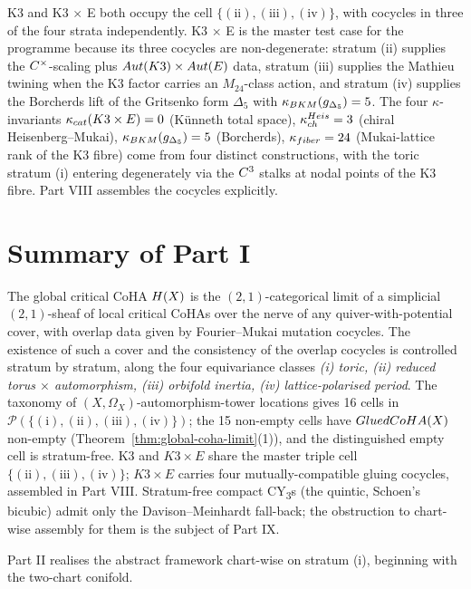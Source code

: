 \begin{remark}
\label{rem:k3e-master-case}
K3 and K3 $\times$ E both occupy the cell
$\{(\text{ii}), (\text{iii}), (\text{iv})\}$, with cocycles in
three of the four strata independently. K3 $\times$ E is the
master test case for the programme because its three cocycles are
non-degenerate: stratum (ii) supplies the $C^\times$-scaling plus
$Aut(K3) \times Aut(E)$ data, stratum (iii) supplies the
Mathieu twining when the K3 factor carries an $M_{24}$-class
action, and stratum (iv) supplies the Borcherds lift of the
Gritsenko form $\Delta_5$ with $\kappa_{BKM}(g_{\Delta_5}) = 5$.
The four $\kappa$-invariants
$\kappa_{cat}(K3 \times E) = 0$ (Künneth total space),
$\kappa_{ch}^{Heis} = 3$ (chiral Heisenberg--Mukai),
$\kappa_{BKM}(g_{\Delta_5}) = 5$ (Borcherds),
$\kappa_{fiber} = 24$ (Mukai-lattice rank of the K3 fibre) come from four
distinct constructions, with the toric stratum (i) entering
degenerately via the $C^3$ stalks at nodal points of the K3
fibre. Part VIII assembles the cocycles explicitly.
\end{remark}

\section{Summary of Part I}
\label{sec:part-i-summary}

The global critical CoHA $H(X)$ is the $(2,1)$-categorical limit
of a simplicial $(2,1)$-sheaf of local critical CoHAs over the
nerve of any quiver-with-potential cover, with overlap data given
by Fourier--Mukai mutation cocycles. The existence of such a
cover and the consistency of the overlap cocycles is controlled
stratum by stratum, along the four equivariance classes
\emph{(i) toric, (ii) reduced torus $\times$ automorphism, (iii)
orbifold inertia, (iv) lattice-polarised period}. The taxonomy of
$(X, \Omega_X)$-automorphism-tower locations gives 16 cells in
$\mathcal{P}(\{(\text{i}), (\text{ii}), (\text{iii}), (\text{iv})\})$;
the 15 non-empty cells have $GluedCoHA(X)$ non-empty
(Theorem~\ref{thm:global-coha-limit}(1)), and the distinguished
empty cell is stratum-free. K3 and $K3 \times E$ share the master
triple cell $\{(\text{ii}), (\text{iii}), (\text{iv})\}$;
$K3 \times E$ carries four mutually-compatible gluing cocycles,
assembled in Part VIII. Stratum-free compact CY\textsubscript{3}s
(the quintic, Schoen's bicubic) admit only the Davison--Meinhardt
fall-back; the obstruction to chart-wise assembly for them is the
subject of Part IX.

Part II realises the abstract framework chart-wise on stratum (i),
beginning with the two-chart conifold.
